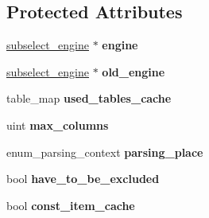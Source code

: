 \subsection*{Protected Attributes}
\begin{DoxyCompactItemize}
\item 
\mbox{\label{classItem__subselect_a788af9043d6c4fc61005e137c302331a}} 
\mbox{\hyperlink{classsubselect__engine}{subselect\+\_\+engine}} $\ast$ {\bfseries engine}
\item 
\mbox{\label{classItem__subselect_aa54ff3bce485e32934afaf46311f1de2}} 
\mbox{\hyperlink{classsubselect__engine}{subselect\+\_\+engine}} $\ast$ {\bfseries old\+\_\+engine}
\item 
\mbox{\label{classItem__subselect_abc1008996a889be2da930bb140bb6ad7}} 
table\+\_\+map {\bfseries used\+\_\+tables\+\_\+cache}
\item 
\mbox{\label{classItem__subselect_a73059e6053757ee2a8e3558e9a6d7f14}} 
uint {\bfseries max\+\_\+columns}
\item 
\mbox{\label{classItem__subselect_a075bd100f2dafa21d394f8074b34e306}} 
enum\+\_\+parsing\+\_\+context {\bfseries parsing\+\_\+place}
\item 
\mbox{\label{classItem__subselect_aacfacb6c4843c5103dd442558602bd2d}} 
bool {\bfseries have\+\_\+to\+\_\+be\+\_\+excluded}
\item 
\mbox{\label{classItem__subselect_a0fed7f18cbf24d6272b3f284958eac91}} 
bool {\bfseries const\+\_\+item\+\_\+cache}
\end{DoxyCompactItemize}
